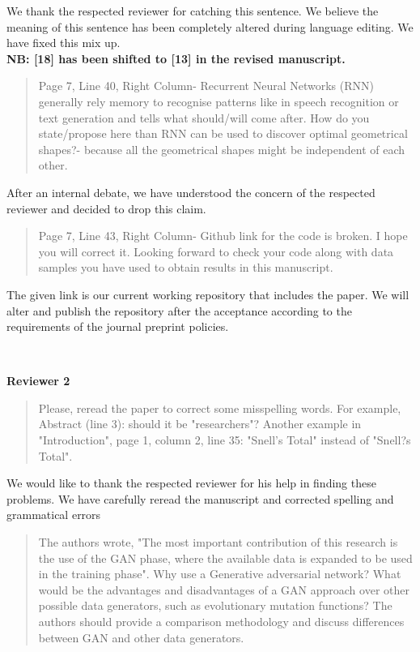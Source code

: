 \documentclass{article}
\begin{document}
	We thank the respected reviewer for catching this sentence. We believe the meaning of this sentence has been completely altered during language editing. We have fixed this mix up. \\
	\textbf{NB: [18] has been shifted to [13] in the revised manuscript.}
	
	\begin{quote}
	Page 7, Line 40, Right Column- Recurrent Neural Networks (RNN) generally rely memory to recognise patterns like in speech recognition or text generation and tells what should/will come after. How do you state/propose here than RNN can be used to discover optimal geometrical shapes?- because all the geometrical shapes might be independent of each other.
	\end{quote}
	
	After an internal debate, we have understood the concern of the respected reviewer and decided to drop this claim.
	
	\begin{quote}
	Page 7, Line 43, Right Column- Github link for the code is broken. I hope you will correct it. Looking forward to check your code along with data samples you have used  to obtain results in this manuscript.
	\end{quote}
	
	The given link is our current working repository that includes the paper. We will alter and publish the repository after the acceptance according to the requirements of the journal preprint policies.
	
	~
	
	{\bfseries\large Reviewer 2}
	
	\begin{quote}
	 Please, reread the paper to correct some misspelling words. For example, Abstract (line 3): should it be "researchers"? Another example in "Introduction", page 1, column 2, line 35: "Snell's Total" instead of "Snell?s Total".
	\end{quote}
	
	We would like to thank the respected reviewer for his help in finding these problems. We have carefully reread the manuscript and corrected spelling and grammatical errors
	
	\begin{quote}
	The authors wrote, "The most important contribution of this research is the use of the GAN phase, where the available data is expanded to be used in the training phase". Why use a Generative adversarial network? What would be the advantages and disadvantages of a GAN approach over other possible data generators, such as evolutionary mutation functions? The authors should provide a comparison methodology and discuss differences between GAN and other data generators.
	\end{quote}
	
\end{document}
